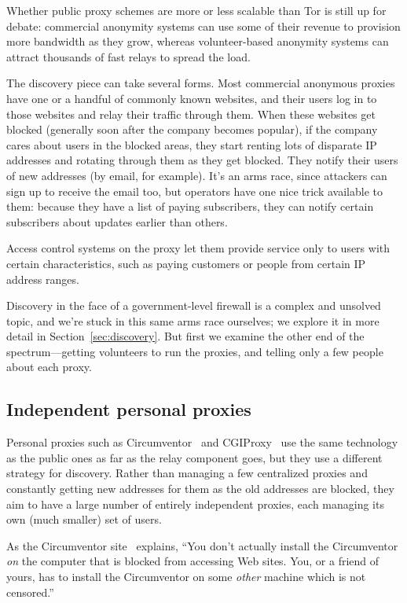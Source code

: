\documentclass{llncs}
\begin{document}
Whether public proxy schemes are more or less scalable than Tor is
still up for debate: commercial anonymity systems can use some of their
revenue to provision more bandwidth as they grow, whereas volunteer-based
anonymity systems can attract thousands of fast relays to spread the load.

The discovery piece can take several forms. Most commercial anonymous
proxies have one or a handful of commonly known websites, and their users
log in to those websites and relay their traffic through them. When
these websites get blocked (generally soon after the company becomes
popular), if the company cares about users in the blocked areas, they
start renting lots of disparate IP addresses and rotating through them
as they get blocked. They notify their users of new addresses (by email,
for example). It's an arms race, since attackers can sign up to receive the
email too, but operators have one nice trick available to them: because they
have a list of paying subscribers, they can notify certain subscribers
about updates earlier than others.

Access control systems on the proxy let them provide service only to
users with certain characteristics, such as paying customers or people
from certain IP address ranges.

Discovery in the face of a government-level firewall is a complex and
unsolved
topic, and we're stuck in this same arms race ourselves; we explore it
in more detail in Section~\ref{sec:discovery}. But first we examine the
other end of the spectrum---getting volunteers to run the proxies,
and telling only a few people about each proxy.

\subsection{Independent personal proxies}

Personal proxies such as Circumventor~\cite{circumventor} and
CGIProxy~\cite{cgiproxy} use the same technology as the public ones as
far as the relay component goes, but they use a different strategy for
discovery. Rather than managing a few centralized proxies and constantly
getting new addresses for them as the old addresses are blocked, they
aim to have a large number of entirely independent proxies, each managing
its own (much smaller) set of users.

As the Circumventor site~\cite{circumventor} explains, ``You don't
actually install the Circumventor \emph{on} the computer that is blocked
from accessing Web sites. You, or a friend of yours, has to install the
Circumventor on some \emph{other} machine which is not censored.''
\end{document}
